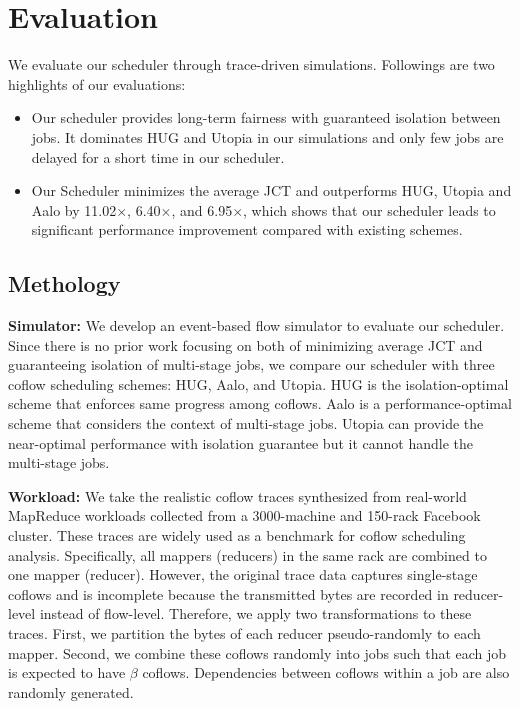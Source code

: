 \documentclass[10pt, conference, letterpaper]{IEEEtran}
\begin{document}
\section{Evaluation}
We evaluate our scheduler through trace-driven simulations. Followings are two highlights of our evaluations:%

\begin{itemize}
	\item Our scheduler provides long-term fairness with guaranteed isolation between jobs. It dominates HUG\cite{HUG} and Utopia\cite{utopia} in our simulations and only few jobs are delayed for a short time in our scheduler.
	\item Our Scheduler minimizes the average JCT and outperforms HUG, Utopia and Aalo by 11.02$\times$, 6.40$\times$, and 6.95$\times$, which shows that our scheduler leads to significant performance improvement compared with existing schemes.
\end{itemize}

\subsection{Methology}\label{evaluation}
\noindent\textbf{Simulator:} We develop an event-based flow simulator to evaluate our scheduler. Since there is no prior work focusing on both of minimizing average JCT and guaranteeing isolation of multi-stage jobs, we compare our scheduler with three coflow scheduling schemes: HUG\cite{HUG}, Aalo\cite{aalo}, and Utopia\cite{utopia}. HUG is the isolation-optimal scheme that enforces same progress among coflows. Aalo is a performance-optimal scheme that considers the context of multi-stage jobs. Utopia can provide the near-optimal performance with isolation guarantee but it cannot handle the multi-stage jobs.

\noindent\textbf{Workload:} We take the realistic coflow traces\cite{benchmark} synthesized from real-world MapReduce workloads collected from a 3000-machine and 150-rack Facebook cluster. These traces are widely used as a benchmark for coflow scheduling analysis\cite{varys,aalo,minimizing,fair}. Specifically, all mappers (reducers) in the same rack are combined to one mapper (reducer). However, the original trace data captures single-stage coflows and is incomplete because the transmitted bytes are recorded in reducer-level instead of flow-level. Therefore, we apply two transformations to these traces. First, we partition the bytes of each reducer pseudo-randomly to each mapper. Second, we combine these coflows randomly into jobs such that each job is expected to have $\beta$ coflows. Dependencies between coflows within a job are also randomly generated.
\end{document}

